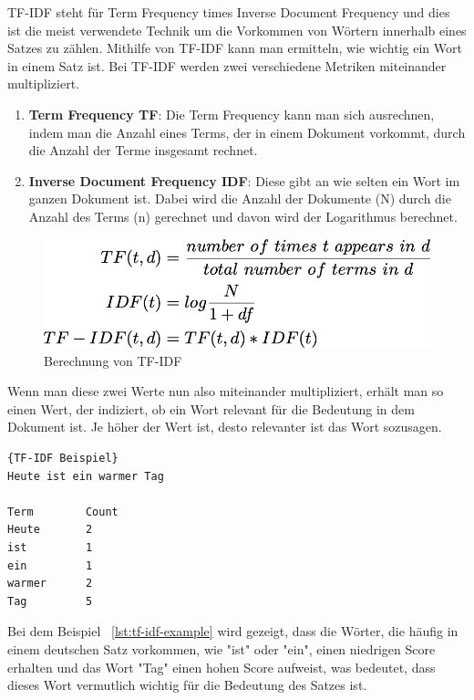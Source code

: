 TF-IDF steht für Term Frequency times Inverse Document Frequency und dies ist die meist verwendete Technik um die Vorkommen von Wörtern innerhalb eines Satzes zu zählen.
Mithilfe von TF-IDF kann man ermitteln, wie wichtig ein Wort in einem Satz ist.
Bei TF-IDF werden zwei verschiedene Metriken miteinander multipliziert.\cite{tfIdf}

\begin{enumerate}
    \item \textbf{Term Frequency TF}: Die Term Frequency kann man sich ausrechnen, indem man die Anzahl eines Terms, der in einem Dokument vorkommt, durch die Anzahl der Terme insgesamt rechnet.
    \item \textbf{Inverse Document Frequency IDF}: Diese gibt an wie selten ein Wort im ganzen Dokument ist.
    Dabei wird die Anzahl der Dokumente (N) durch die Anzahl des Terms (n) gerechnet und davon wird der Logarithmus berechnet.
\end{enumerate}

\begin{figure}[hbt!]
    \centering
    \includegraphics[scale=0.35]{pics/tf_idf}
    \caption{Berechnung von TF-IDF~\cite{tfIdfImage}}
    \label{fig:tf-idf}
\end{figure}

Wenn man diese zwei Werte nun also miteinander multipliziert, erhält man so einen Wert, der indiziert, ob ein Wort relevant für die Bedeutung in dem Dokument ist.
Je höher der Wert ist, desto relevanter ist das Wort sozusagen.

\begin{lstlisting}[label={lst:tf-idf-example},caption={TF-IDF Beispiel}]{TF-IDF Beispiel}
Heute ist ein warmer Tag

Term        Count
Heute       2
ist         1
ein         1
warmer      2
Tag         5
\end{lstlisting}

Bei dem Beispiel ~\ref{lst:tf-idf-example} wird gezeigt, dass die Wörter, die häufig in einem deutschen Satz vorkommen, wie "ist" oder "ein", einen niedrigen Score erhalten und das Wort "Tag" einen hohen Score aufweist, was bedeutet, dass dieses Wort vermutlich wichtig für die Bedeutung des Satzes ist.

